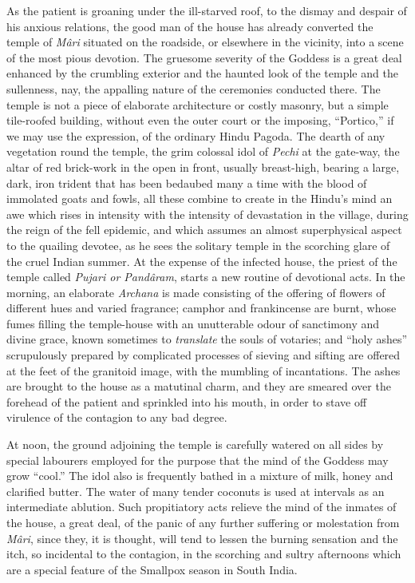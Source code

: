 \documentclass[a4paper, 12pt, oneside, english, twocolumn]{article}
\begin{document}
As the patient is groaning under the ill-starved roof, to the dismay and despair of his anxious relations, the good man of the house has already converted the temple of \emph{Mâri} situated on the roadside, or elsewhere in the vicinity, into a scene of the most pious devotion. The gruesome severity of the Goddess is a great deal enhanced by the crumbling exterior and the haunted look of the temple and the sullenness, nay, the appalling nature of the ceremonies conducted there. The temple is not a piece of elaborate architecture or costly masonry, but a simple tile-roofed building, without even the outer court or the imposing, ``Portico,'' if we may use the expression, of the ordinary Hindu Pagoda. The dearth of any vegetation round the temple, the grim colossal idol of \emph{Pechi} at the gate-way, the altar of red brick-work in the open in front, usually breast-high, bearing a large, dark, iron trident that has been bedaubed many a time with the blood of immolated goats and fowls, all these combine to create in the Hindu's mind an awe which rises in intensity with the intensity of devastation in the village, during the reign of the fell epidemic, and which assumes an almost superphysical aspect to the quailing devotee, as he sees the solitary temple in the scorching glare of the cruel Indian summer. At the expense of the infected house, the priest of the temple called \emph{Pujari or Pandâram}, starts a new routine of devotional acts. In the morning, an elaborate \emph{Archana} is made consisting of the offering of flowers of different hues and varied fragrance; camphor and frankincense are burnt, whose fumes filling the temple-house with an unutterable odour of sanctimony and divine grace, known sometimes to \emph{translate} the souls of votaries; and ``holy ashes'' scrupulously prepared by complicated processes of sieving and sifting are offered at the feet of the granitoid image, with the mumbling of incantations. The ashes are brought to the house as a matutinal charm, and they are smeared over the forehead of the patient and sprinkled into his mouth, in order to stave off virulence of the contagion to any bad degree.

At noon, the ground adjoining the temple is carefully watered on all sides by special labourers employed for the purpose that the mind of the Goddess may grow ``cool.'' The idol also is frequently bathed in a mixture of milk, honey and clarified butter. The water of many tender coconuts is used at intervals as an intermediate ablution. Such propitiatory acts relieve the mind of the inmates of the house, a great deal, of the panic of any further suffering or molestation from \emph{Mâri}, since they, it is thought, will tend to lessen the burning sensation and the itch, so incidental to the contagion, in the scorching and sultry afternoons which are a special feature of the Smallpox season in South India.
\end{document}
